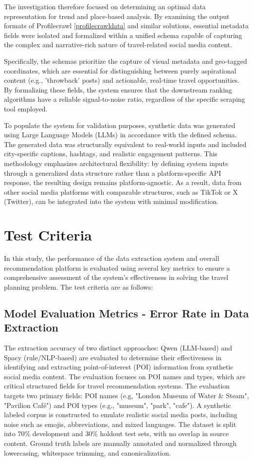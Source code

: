 \documentclass[a4paper,12pt]{report}
\begin{document}
The investigation therefore focused on determining an optimal data representation for trend and place-based analysis. By examining the output formats of Profilecrawl \ref{profilecrawldata} and similar solutions, essential metadata fields were isolated and formalized within a unified schema capable of capturing the complex and narrative-rich nature of travel-related social media content.

Specifically, the schemas prioritize the capture of visual metadata and geo-tagged coordinates, which are essential for distinguishing between purely aspirational content (e.g., 'throwback' posts) and actionable, real-time travel opportunities. By formalizing these fields, the system ensures that the downstream ranking algorithms have a reliable signal-to-noise ratio, regardless of the specific scraping tool employed.

To populate the system for validation purposes, synthetic data was generated using Large Language Models (LLMs) in accordance with the defined schema. The generated data was structurally equivalent to real-world inputs and included city-specific captions, hashtags, and realistic engagement patterns. This methodology emphasizes architectural flexibility: by defining system inputs through a generalized data structure rather than a platform-specific API response, the resulting design remains platform-agnostic. As a result, data from other social media platforms with comparable structures, such as TikTok or X (Twitter), can be integrated into the system with minimal modification.

\section{Test Criteria}

In this study, the performance of the data extraction system and overall recommendation platform is evaluated using several key metrics to ensure a comprehensive assessment of the system's effectiveness in solving the travel planning problem. The test criteria are as follows:

\subsection{Model Evaluation Metrics - Error Rate in Data Extraction}

The extraction accuracy of two distinct approaches: Qwen (LLM-based) and Spacy (rule/NLP-based) are evaluated to determine their effectiveness in identifying and extracting point-of-interest (POI) information from synthetic social media content. The evaluation focuses on POI names and types, which are critical structured fields for travel recommendation systems.
The evaluation targets two primary fields: POI names (e.g, "London Museum of Water \& Steam", "Pavilion Café") and POI types (e.g., "museum", "park", "cafe"). A synthetic labeled corpus is constructed to emulate realistic social media posts, including noise such as emojis, abbreviations, and mixed languages. The dataset is split into 70\% development and 30\% holdout test sets, with no overlap in source content. Ground truth labels are manually annotated and normalized through lowercasing, whitespace trimming, and canonicalization.
\end{document}
